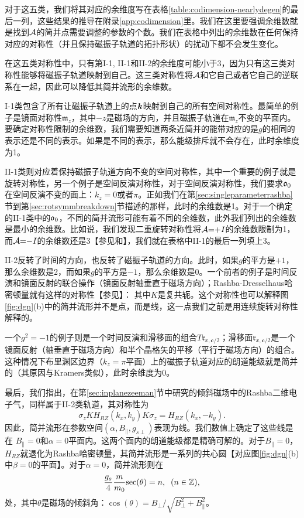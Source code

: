 对于这五类，我们将其对应的余维度写在表格\ref{table:codimension-nearlydegen}的最后一列，这些结果的推导在附录\ref{app:codimension}里。我们在这里要强调余维数就是找到${\cal A}$的简并点需要调整的参数的个数。我们在表格中列出的余维数在任何保持对应的对称性（并且保持磁振子轨道的拓扑形状）的扰动下都不会发生变化。
 
在这五类对称性中，只有第I-1, II-1和II-2的余维度可能小于3，因为只有这三类对称性能够将磁振子轨道映射到自己。这三类对称性将${\cal A}$和它自己或者它自己的逆联系在一起，因此可以降低其简并流形的余维数。

I-1类包含了所有让磁振子轨道上的点$\boldsymbol{k}$映射到自己的所有空间对称性。最简单的例子是镜面对称性$\mathfrak{m}_z$，其中$-z$是磁场的方向，并且磁振子轨道在$\mathfrak{m}_z$不变的平面内。要确定对称性限制的余维数，我们需要知道两条近简并的能带对应的是$g$的相同的表示还是不同的表示。如果是不同的表示，那么能级排斥就不会存在，此时余维度为1。

II-1类则对应着保持磁振子轨道方向不变的空间对称性，其中一个重要的例子就是旋转对称性，另一个例子是空间反演对称性，对于空间反演对称性，我们要求$\mathfrak{o}_0$在空间反演不变的面上：$k_z=0$或者$\pi$。正如我们在第\ref{sec:singleparameterrashba}节到第\ref{sec:rotsymmbreakdown}节描述的那样，此时的余维数是1。对于一个确定的II-1类中的$\mathfrak{o}_0$，不同的简并流形可能有着不同的余维数，此外我们列出的余维数是最小的余维数。比如说，我们发现二重旋转对称性将${\cal A}{=}{+}I$的余维数限制为1，而${\cal A}{=}{-}I$的余维数还是3【参见和】，我们就在表格中II-1的最后一列填上3。


II-2反转了时间的方向，也反转了磁振子轨道的方向。此时，如果$g$的平方是$+1$，那么余维数是2，而如果$g$的平方是$-1$，那么余维数是0。一个前者的例子是时间反演和镜面反射的联合操作（镜面反射轴垂直于磁场方向）；Rashba-Dresselhaus哈密顿量就有这样的对称性【参见】：
其中$K$是复共轭。这个对称性也可以解释图\ref{fig:dgn}(b)中的简并流形并不是点，而是线，这一点我们之前是用连续旋转对称性解释的。


一个$g^2{=}-1$的例子则是一个时间反演和滑移面的组合$T\mathfrak{r}_{x,\boldsymbol{c}/2}$；滑移面$\mathfrak{r}_{x,\boldsymbol{c}/2}$是一个镜面反射（轴垂直于磁场方向）和半个晶格矢的平移（平行于磁场方向）的组合。这种情况下布里渊区边界（$k_z{=}\pi$平面）上的磁振子轨道对应的朗道能级就是简并的（其原因与Kramers类似），此时余维度为0。

最后，我们指出，在第\ref{sec:inplanezeeman}节中研究的倾斜磁场中的Rashba二维电子气，同样属于II-2类轨道，其对称性为
\begin{equation}
\sigma_z K H_{RZ}(k_x, k_y) K \sigma_z=H_{RZ}(k_x, -k_y).
\end{equation}
因此，简并流形在参数空间$(\alpha, B_\parallel, g_{s\perp})$表现为线。我们数值上确定了这些线是在 $B_\parallel=0$和$\alpha=0$平面内。这两个面内的朗道能级都是精确可解的。对于$B_\parallel=0$，$H_{RZ}$就退化为Rashba哈密顿量，其简并流形是一系列的共心圆【对应图\ref{fig:dgn}(b)中$\beta=0$的平面】。对于$\alpha=0$，简并流形则在
\begin{equation}
    \frac{g_s}{4} \frac{ m}{ m_0}\text{sec}(\theta)=n,\;\;(n\in\mathbb{Z}),
\end{equation}
处，其中$\theta$是磁场的倾斜角：$\cos(\theta)=B_\perp/\sqrt{B_\perp^2+B_\parallel^2}$。


